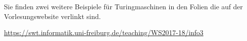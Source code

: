 
{
\color{red}
Sie finden zwei weitere Beispiele für Turingmaschinen in den Folien die auf der Vorlesungswebsite verlinkt sind.

\url{https://swt.informatik.uni-freiburg.de/teaching/WS2017-18/info3}
}

